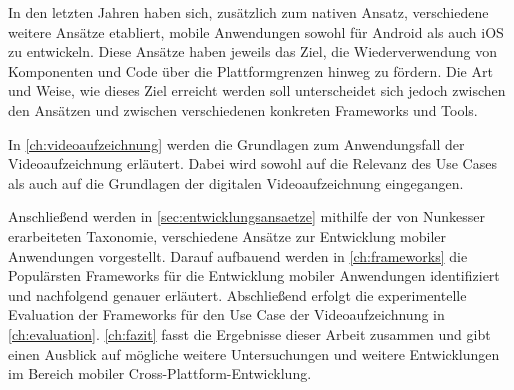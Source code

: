 In den letzten Jahren haben sich, zusätzlich zum nativen Ansatz, verschiedene weitere Ansätze etabliert, mobile Anwendungen sowohl für Android als auch iOS zu entwickeln.
Diese Ansätze haben jeweils das Ziel, die Wiederverwendung von Komponenten und Code über die Plattformgrenzen hinweg zu fördern.
Die Art und Weise, wie dieses Ziel erreicht werden soll unterscheidet sich jedoch zwischen den Ansätzen und zwischen verschiedenen konkreten Frameworks und Tools.

In \autoref{ch:videoaufzeichnung} werden die Grundlagen zum Anwendungsfall der Videoaufzeichnung erläutert.
Dabei wird sowohl auf die Relevanz des Use Cases als auch auf die Grundlagen der digitalen Videoaufzeichnung eingegangen.




Anschließend werden in \autoref{sec:entwicklungsansaetze} mithilfe der von Nunkesser \cite{Nunkesser_Taxonomy_Apps} erarbeiteten Taxonomie, verschiedene Ansätze zur Entwicklung mobiler Anwendungen vorgestellt.
Darauf aufbauend werden in \autoref{ch:frameworks} die Populärsten Frameworks für die Entwicklung mobiler Anwendungen identifiziert und nachfolgend genauer erläutert.
Abschließend erfolgt die experimentelle Evaluation der Frameworks für den Use Case der Videoaufzeichnung in \autoref{ch:evaluation}.
\autoref{ch:fazit} fasst die Ergebnisse dieser Arbeit zusammen und gibt einen Ausblick auf mögliche weitere Untersuchungen und weitere Entwicklungen im Bereich mobiler Cross-Plattform-Entwicklung.

